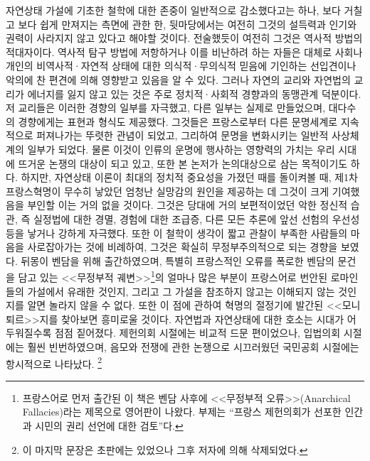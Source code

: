 자연상태 가설에 기초한 철학에 대한 존중이 일반적으로 감소했다고는 하나,
보다 거칠고 보다 쉽게 만져지는 측면에 관한 한,
뒷마당에서는 여전히 그것의 설득력과 인기와 권력이 사라지지 않고 있다고
해야할 것이다.
전술했듯이 여전히 그것은 역사적 방법의 적대자이다.
역사적 탐구 방법에  저항하거나
이를 비난하려 하는 자들은
대체로 사회나 개인의 비역사적^^b7자연적 상태에 대한 의식적^^b7무의식적
믿음에 기인하는 선입견이나 악의에 찬 편견에 의해 영향받고 있음을 알 수 있다.
그러나 자연의 교리와 자연법의 교리가 에너지를 잃지 않고 있는 것은
주로 정치적^^b7사회적 경향과의 동맹관계 덕분이다.
저 교리들은 이러한 경향의 일부를 자극했고, 다른 일부는 실제로 만들었으며,
대다수의 경향에게는 표현과 형식도 제공했다.
그것들은 프랑스로부터 다른 문명세계로 지속적으로 퍼져나가는 뚜렷한 관념이
되었고, 그리하여 문명을 변화시키는 일반적 사상체계의 일부가 되었다.
물론 이것이 인류의 운명에 행사하는 영향력의 가치는 우리 시대에
뜨거운 논쟁의 대상이 되고 있고, 또한 본 논저가 논의대상으로 삼는
목적이기도 하다.
하지만, 자연상태 이론이 최대의 정치적 중요성을 가졌던 때를 돌이켜볼 때,
제1차 프랑스혁명이 무수히 낳았던 엄청난 실망감의 원인을 제공하는 데
그것이 크게
기여했음을 부인할 이는 거의 없을 것이다.
그것은 당대에 거의 보편적이었던 악한 정신적 습관, 즉
실정법에 대한 경멸, 경험에 대한 조급증,
다른 모든 추론에 앞선 선험의 우선성 등을 낳거나
강하게 자극했다.
또한 이 철학이 생각이 짧고 관찰이 부족한 사람들의 마음을
사로잡아가는 것에 비례하여, 그것은 확실히 무정부주의적으로 되는 경향을 보였다.
뒤몽이 벤담을 위해 출간하였으며,
특별히 프랑스적인 오류를 폭로한 벤담의 문건을 담고 있는
<<무정부적 궤변>>\footnote{%
프랑스어로 먼저 출간된 이 책은
벤담 사후에 <<무정부적 오류>>(Anarchical Fallacies)라는 제목으로
영어판이 나왔다. 부제는
``프랑스 제헌의회가 선포한 인간과 시민의 권리 선언에 대한 검토''다.}의
얼마나 많은 부분이
프랑스어로 번안된 로마인들의 가설에서 유래한 것인지, 그리고
그 가설을 참조하지 않고는 이해되지 않는 것인지를 알면 놀라지 않을 수 없다.
또한 이 점에 관하여 혁명의 절정기에 발간된 <<모니퇴르>>지를
찾아보면 흥미로울 것이다.
자연법과 자연상태에 대한 호소는 시대가 어두워질수록 점점 짙어졌다.
제헌의회 시절에는 비교적 드문 편이었으나,
입법의회 시절에는 훨씬 빈번하였으며,
음모와 전쟁에 관한 논쟁으로 시끄러웠던 국민공회 시절에는
항시적으로 나타났다.
\footnote{이 마지막 문장은 초판에는 있었으나 그후 저자에 의해 삭제되었다.}


